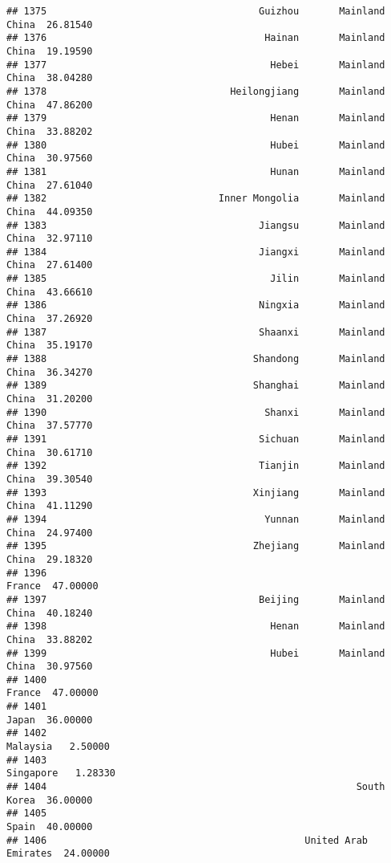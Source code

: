 \documentclass[
]{article}
\begin{document}
\begin{verbatim}
## 1375                                     Guizhou       Mainland China  26.81540
## 1376                                      Hainan       Mainland China  19.19590
## 1377                                       Hebei       Mainland China  38.04280
## 1378                                Heilongjiang       Mainland China  47.86200
## 1379                                       Henan       Mainland China  33.88202
## 1380                                       Hubei       Mainland China  30.97560
## 1381                                       Hunan       Mainland China  27.61040
## 1382                              Inner Mongolia       Mainland China  44.09350
## 1383                                     Jiangsu       Mainland China  32.97110
## 1384                                     Jiangxi       Mainland China  27.61400
## 1385                                       Jilin       Mainland China  43.66610
## 1386                                     Ningxia       Mainland China  37.26920
## 1387                                     Shaanxi       Mainland China  35.19170
## 1388                                    Shandong       Mainland China  36.34270
## 1389                                    Shanghai       Mainland China  31.20200
## 1390                                      Shanxi       Mainland China  37.57770
## 1391                                     Sichuan       Mainland China  30.61710
## 1392                                     Tianjin       Mainland China  39.30540
## 1393                                    Xinjiang       Mainland China  41.11290
## 1394                                      Yunnan       Mainland China  24.97400
## 1395                                    Zhejiang       Mainland China  29.18320
## 1396                                                           France  47.00000
## 1397                                     Beijing       Mainland China  40.18240
## 1398                                       Henan       Mainland China  33.88202
## 1399                                       Hubei       Mainland China  30.97560
## 1400                                                           France  47.00000
## 1401                                                            Japan  36.00000
## 1402                                                         Malaysia   2.50000
## 1403                                                        Singapore   1.28330
## 1404                                                      South Korea  36.00000
## 1405                                                            Spain  40.00000
## 1406                                             United Arab Emirates  24.00000

\end{verbatim}
\end{document}
